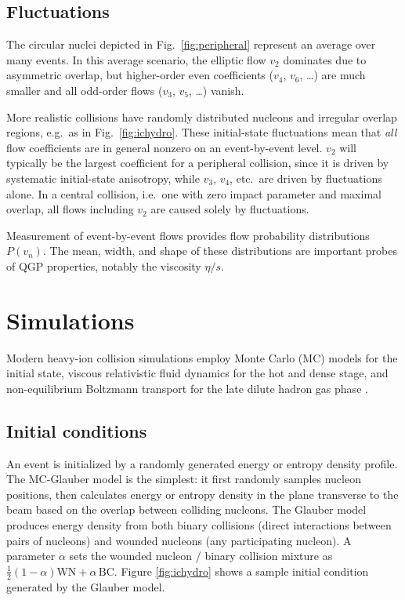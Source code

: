 \documentclass[reprint,amsmath]{revtex4-1}
\begin{document}
\subsection{Fluctuations}

The circular nuclei depicted in Fig.\ \ref{fig:peripheral} represent an average over many events.  In this average scenario, the elliptic
flow $v_2$ dominates due to asymmetric overlap, but higher-order even coefficients ($v_4$, $v_6$, \ldots) are much smaller and all odd-order
flows ($v_3$, $v_5$, \ldots) vanish.

More realistic collisions have randomly distributed nucleons and irregular overlap regions, e.g.\ as in Fig.\ \ref{fig:ichydro}.  These
initial-state fluctuations mean that \emph{all} flow coefficients are in general nonzero on an event-by-event level.  $v_2$ will typically
be the largest coefficient for a peripheral collision, since it is driven by systematic initial-state anisotropy, while $v_3$, $v_4$, etc.\
are driven by fluctuations alone.  In a central collision, i.e.\ one with zero impact parameter and maximal overlap, all flows including
$v_2$ are caused solely by fluctuations.

Measurement of event-by-event flows provides flow probability distributions $P(v_n)$.  The mean, width, and shape of these distributions are
important probes of QGP properties, notably the viscosity $\eta/s$.




\section{Simulations}

Modern heavy-ion collision simulations employ Monte Carlo (MC) models for the initial state, viscous relativistic fluid dynamics for the hot and
dense stage, and non-equilibrium Boltzmann transport for the late dilute hadron gas phase \cite{bass-dumitru,nonaka-bass,song}.


\subsection{Initial conditions}

An event is initialized by a randomly generated energy or entropy density profile.  The MC-Glauber model \cite{glauber} is the simplest:  it first randomly
samples nucleon positions, then calculates energy or entropy density in the plane transverse to the beam based on the overlap between
colliding nucleons.  The Glauber model produces energy density from both binary collisions (direct interactions between pairs of nucleons)
and wounded nucleons (any participating nucleon).  A parameter $\alpha$ sets the wounded nucleon / binary collision mixture as
$\frac{1}{2}(1-\alpha)\text{WN} + \alpha\,\text{BC}$.
Figure \ref{fig:ichydro} shows a sample initial condition generated by the Glauber model.
\end{document}
